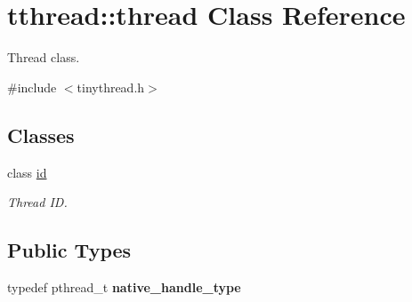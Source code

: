 \hypertarget{classtthread_1_1thread}{}\section{tthread\+:\+:thread Class Reference}
\label{classtthread_1_1thread}


Thread class.  




{\ttfamily \#include $<$tinythread.\+h$>$}

\subsection*{Classes}
\begin{DoxyCompactItemize}
\item 
class \hyperlink{classtthread_1_1thread_1_1id}{id}
\begin{DoxyCompactList}\small\item\em Thread ID. \end{DoxyCompactList}\end{DoxyCompactItemize}
\subsection*{Public Types}
\begin{DoxyCompactItemize}
\item 
typedef pthread\+\_\+t {\bfseries native\+\_\+handle\+\_\+type}\hypertarget{classtthread_1_1thread_a2b7fe78629653d8f689734217e905cd5}{}\label{classtthread_1_1thread_a2b7fe78629653d8f689734217e905cd5}

\end{DoxyCompactItemize}
